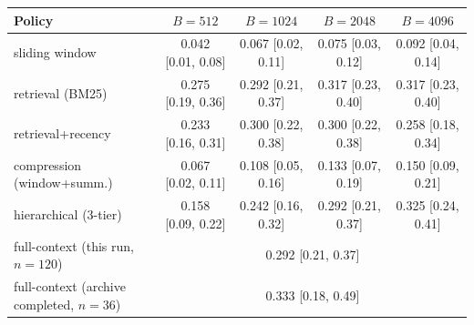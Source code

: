 \begin{tabular}{lcccc}
\toprule
Policy & $B{=}512$ & $B{=}1024$ & $B{=}2048$ & $B{=}4096$ \\
\midrule
sliding window & 0.042 [0.01, 0.08] & 0.067 [0.02, 0.11] & 0.075 [0.03, 0.12] & 0.092 [0.04, 0.14] \\
retrieval (BM25) & 0.275 [0.19, 0.36] & 0.292 [0.21, 0.37] & 0.317 [0.23, 0.40] & 0.317 [0.23, 0.40] \\
retrieval+recency & 0.233 [0.16, 0.31] & 0.300 [0.22, 0.38] & 0.300 [0.22, 0.38] & 0.258 [0.18, 0.34] \\
compression (window+summ.) & 0.067 [0.02, 0.11] & 0.108 [0.05, 0.16] & 0.133 [0.07, 0.19] & 0.150 [0.09, 0.21] \\
hierarchical (3-tier) & 0.158 [0.09, 0.22] & 0.242 [0.16, 0.32] & 0.292 [0.21, 0.37] & 0.325 [0.24, 0.41] \\
\midrule
full-context (this run, $n{=}120$) & \multicolumn{4}{c}{0.292 [0.21, 0.37]} \\
full-context (archive completed, $n{=}36$) & \multicolumn{4}{c}{0.333 [0.18, 0.49]} \\
\bottomrule
\end{tabular}